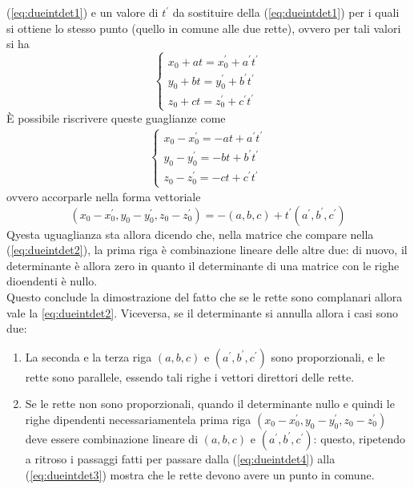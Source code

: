 (\ref{eq:dueintdet1}) e un valore di $t^\prime$ da sostituire della
(\ref{eq:dueintdet1}) per i quali si ottiene lo stesso punto (quello in
comune alle due rette), ovvero per tali valori si ha
\begin{equation}
  \label{eq:dueintdet3}
  \begin{cases}
    x_0 +at=x_0^\prime+a^\prime t^\prime\\
    y_0 + bt = y_0^\prime + b^\prime t^\prime\\
    z_0+ct=z_0^\prime+c^\prime t^\prime
  \end{cases}
\end{equation}
È possibile riscrivere queste guaglianze come
\begin{eqnarray*}
  \begin{cases}
    x_0-x_0^\prime=-at+a^\prime t^\prime\\
    y_0-y_0^\prime=-bt+b^\prime t^\prime\\
    z_0-z_0^\prime=-ct+c^\prime t^\prime
  \end{cases}
\end{eqnarray*}
ovvero accorparle nella forma vettoriale
\begin{equation}
  \label{eq:dueintdet4}
  (x_0-x_0^\prime,y_0-y_0^\prime,z_0-z_0^\prime)=-(a,b,c)+t^\prime(a^\prime,
  b^\prime,c^\prime) 
\end{equation}
Qyesta uguaglianza sta allora dicendo che, nella matrice che compare nella
(\ref{eq:dueintdet2}), la prima riga è combinazione lineare delle altre
due: di nuovo, il determinante è allora zero in quanto il determinante di
una matrice con le righe dioendenti è nullo.\\
Questo conclude la dimostrazione del fatto che se le rette sono complanari
allora vale la \ref{eq:dueintdet2}. Viceversa, se il determinante si
annulla allora i casi sono due:
\begin{enumerate}
\item La seconda e la terza riga $(a,b,c)$ e $(a^\prime,b^\prime,c^\prime)$
  sono proporzionali, e le rette sono parallele, essendo tali righe i
  vettori direttori delle rette.
\item Se le rette non sono proporzionali, quando il determinante nullo e
  quindi le righe dipendenti necessariamentela prima riga
  $(x_0-x_0^\prime, y_0-y_0^\prime, z_0-z_0^\prime)$ deve essere
  combinazione lineare di $(a,b,c)$ e $(a^\prime,b^\prime,c^\prime)$:
  questo, ripetendo a ritroso i passaggi fatti per passare dalla
  (\ref{eq:dueintdet4}) alla (\ref{eq:dueintdet3}) mostra che le rette
  devono avere un punto in comune.
\end{enumerate}
  
